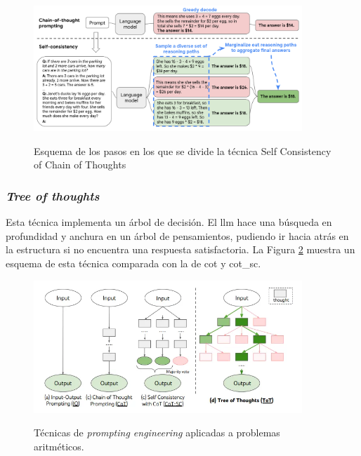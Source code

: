\begin{figure}[H]
    \caption{Esquema de los pasos en los que se divide la técnica {Self Consistency of Chain of Thoughts}}
    \centering
    \includegraphics[width=0.9\textwidth]{./figuras/cot_sc.png}
    \label{fig:cot_sc}
\end{figure}

\subsubsection{\emph{Tree of thoughts}}

Esta técnica implementa un árbol de decisión. El \gls{llm} hace una búsqueda en profundidad y anchura en un árbol de pensamientos, pudiendo ir hacia atrás en la estructura si no encuentra una respuesta satisfactoria. La Figura \ref{fig:prompting_engineering} muestra un esquema de esta técnica comparada con la de \gls{cot} y \gls{cot_sc}.

\begin{figure}[H]
  \caption[Técnicas de \emph{prompting engineering}]{Técnicas de \emph{prompting engineering} aplicadas a problemas aritméticos.}
  \centering
  \includegraphics[width=0.9\textwidth]{./figuras/prompt_engineering_techniques.png}
  \label{fig:prompting_engineering}
\end{figure}


